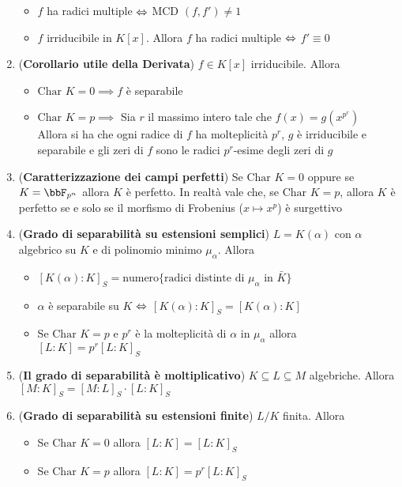 \documentclass[a4paper,NoNotes,GeneralMath]{stdmdoc}
\newcommand{\MCD}{\text{MCD }}
\newcommand{\Char}{\text{Char }}
\begin{document}
\begin{enumerate}
			\begin{itemize}
				\item $f$ ha radici multiple $\Leftrightarrow$ $\MCD(f,f') \neq 1$
				\item $f$ irriducibile in $K[x]$. Allora $f$ ha radici multiple $\Leftrightarrow$ $f' \equiv 0$
			\end{itemize}
		\item ({\bf Corollario utile della Derivata}) $f \in K[x]$ irriducibile. Allora \\
			\begin{itemize}
				\item $\Char K = 0 \implies f$ è separabile
				\item $\Char K = p \implies $ Sia $r$ il massimo intero tale che $f(x) = g(x^{p^r})$ \\
					Allora si ha che ogni radice di $f$ ha molteplicità $p^r$, $g$ è irriducibile e separabile e gli zeri di $f$ sono le radici $p^r$-esime degli zeri di $g$
			\end{itemize}
		\item ({\bf Caratterizzazione dei campi perfetti}) Se $\Char K = 0$ oppure se $K = \bbF_{p^n}$ allora $K$ è perfetto. In realtà vale che, se $\Char K = p$, allora $K$ è perfetto se e solo se il morfismo di Frobenius ($x \mapsto x^p$) è surgettivo
		\item ({\bf Grado di separabilità su estensioni semplici}) $L = K(\alpha)$ con $\alpha$ algebrico su $K$ e di polinomio minimo $\mu_\alpha$. Allora \\
			\begin{itemize}
				\item $[K(\alpha):K]_S = \text{numero}\{\text{radici distinte di }\mu_\alpha\text{ in }\bar{K}\}$
				\item $\alpha$ è separabile su $K$ $\Leftrightarrow$ $[K(\alpha):K]_S = [K(\alpha):K]$
				\item Se $\Char K = p$ e $p^r$ è la molteplicità di $\alpha$ in $\mu_\alpha$ allora $[L:K] = p^r [L:K]_S$
			\end{itemize}
		\item ({\bf Il grado di separabilità è moltiplicativo}) $K \subseteq L \subseteq M$ algebriche. Allora $[M:K]_S = [M:L]_S \cdot [L:K]_S$
		\item ({\bf Grado di separabilità su estensioni finite}) $L/K$ finita. Allora \\
			\begin{itemize}
				\item Se $\Char K = 0$ allora $[L:K] = [L:K]_S$
				\item Se $\Char K = p$ allora $[L:K] = p^r [L:K]_S$

\end{itemize}
\end{enumerate}
\end{document}
